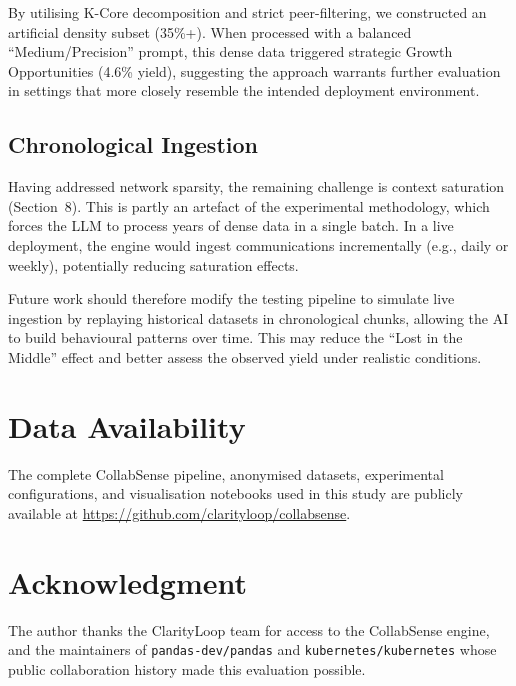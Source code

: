 \documentclass[a4paper,UKenglish,cleveref,autoref]{lipics-v2021}
\begin{document}
By utilising K-Core decomposition and strict peer-filtering, we constructed an artificial density subset (35\%+). When processed with a balanced ``Medium/Precision'' prompt, this dense data triggered strategic Growth Opportunities (4.6\% yield), suggesting the approach warrants further evaluation in settings that more closely resemble the intended deployment environment.

\subsection{Chronological Ingestion}
Having addressed network sparsity, the remaining challenge is context saturation (Section~8). This is partly an artefact of the experimental methodology, which forces the LLM to process years of dense data in a single batch. In a live deployment, the engine would ingest communications incrementally (e.g., daily or weekly), potentially reducing saturation effects.

Future work should therefore modify the testing pipeline to simulate live ingestion by replaying historical datasets in chronological chunks, allowing the AI to build behavioural patterns over time. This may reduce the ``Lost in the Middle'' effect and better assess the observed yield under realistic conditions.

\section*{Data Availability}
The complete CollabSense pipeline, anonymised datasets, experimental configurations, and visualisation notebooks used in this study are publicly available at \url{https://github.com/clarityloop/collabsense}.

\section*{Acknowledgment}
The author thanks the ClarityLoop team for access to the CollabSense engine, and the maintainers of \texttt{pandas-dev/pandas} and \texttt{kubernetes/kubernetes} whose public collaboration history made this evaluation possible.


\end{document}
